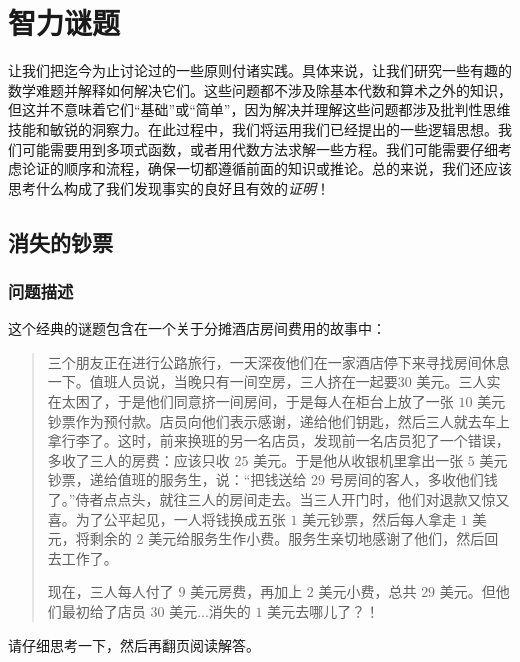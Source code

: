 \section{智力谜题}\label{sec:section1.4}

让我们把迄今为止讨论过的一些原则付诸实践。具体来说，让我们研究一些有趣的数学难题并解释如何解决它们。这些问题都不涉及除基本代数和算术之外的知识，但这并不意味着它们“基础”或“简单”，因为解决并理解这些问题都涉及批判性思维技能和敏锐的洞察力。在此过程中，我们将运用我们已经提出的一些逻辑思想。我们可能需要用到多项式函数，或者用代数方法求解一些方程。我们可能需要仔细考虑论证的顺序和流程，确保一切都遵循前面的知识或推论。总的来说，我们还应该思考什么构成了我们发现事实的良好且有效的\textit{证明}！

\subsection{消失的钞票}

\subsubsection*{问题描述}

这个经典的谜题包含在一个关于分摊酒店房间费用的故事中：

\begin{quote}
    三个朋友正在进行公路旅行，一天深夜他们在一家酒店停下来寻找房间休息一下。值班人员说，当晚只有一间空房，三人挤在一起要$30$ 美元。三人实在太困了，于是他们同意挤一间房间，于是每人在柜台上放了一张 $10$ 美元钞票作为预付款。店员向他们表示感谢，递给他们钥匙，然后三人就去车上拿行李了。这时，前来换班的另一名店员，发现前一名店员犯了一个错误，多收了三人的房费：应该只收 $25$ 美元。于是他从收银机里拿出一张 $5$ 美元钞票，递给值班的服务生，说：“把钱送给 29 号房间的客人，多收他们钱了。”侍者点点头，就往三人的房间走去。当三人开门时，他们对退款又惊又喜。为了公平起见，一人将钱换成五张 $1$ 美元钞票，然后每人拿走 $1$ 美元，将剩余的 $2$ 美元给服务生作小费。服务生亲切地感谢了他们，然后回去工作了。

    现在，三人每人付了 $9$ 美元房费，再加上 $2$ 美元小费，总共 $29$ 美元。但他们最初给了店员 $30$ 美元...消失的 $1$ 美元去哪儿了？！
\end{quote}

请仔细思考一下，然后再翻页阅读解答。

\clearpage

\subsubsection*{解答：仔细追踪资金}

